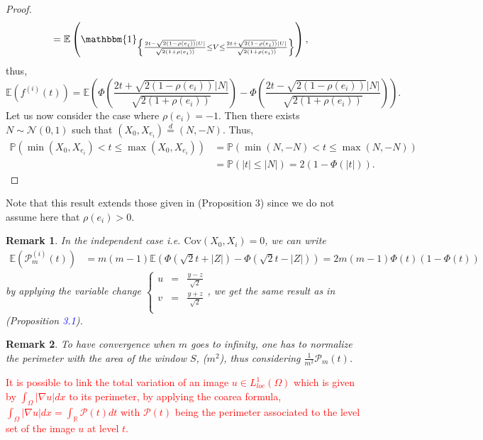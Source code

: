 \documentclass[12pt]{article}
\theoremstyle{Theorem}
\newtheorem{remark}{Remark}
\begin{document}
\begin{proof}
{\begin{align*}
& = \mathbb{E}\left(\mathbbm{1}_{\left\{\frac{2t - \sqrt{2(1-\rho(e_i))}|U|}{\sqrt{2(1+\rho(e_i))}}  \leq V \leq \frac{2t + \sqrt{2(1-\rho(e_i))}|U|}{\sqrt{2(1+\rho(e_i))}}\right\}}\right), 
\end{align*}}  
thus,
$$\mathbb{E}\left(f^{(i)}(t)\right) = \mathbb{E}\left(\Phi\left(\dfrac{2t + \sqrt{2(1-\rho(e_i))}|N|}{\sqrt{2(1+\rho(e_i))}}\right)  - \Phi\left(\dfrac{2t - \sqrt{2(1-\rho(e_i))}|N|}{\sqrt{2(1+\rho(e_i))}}\right)\right).$$
Let us now consider the case where $\rho(e_i) = -1$. Then there exists $N \sim \mathcal{N}\left(0,1\right)$ such that $\left(X_{\scriptscriptstyle 0}, X_{e_i}\right) \overset{d}{=} \left(N, -N\right)$. Thus, 
\begin{align*}
\mathbb{P}\left(\min\left(X_{\scriptscriptstyle 0}, X_{e_i}\right) < t \leq \max\left(X_{\scriptscriptstyle 0}, X_{e_i}\right)\right) & = \mathbb{P}\left(\min\left(N, -N\right) < t \leq \max\left(N, -N\right)\right) \\
& = \mathbb{P}\left(|t| \leq |N|\right) = 2\left(1 - \Phi\left(|t|\right)\right).
\end{align*}
\end{proof}
Note that this result extends those given in \cite{HermineAgnes} (Proposition 3) since we do not assume here that $\rho(e_i) > 0$. 
\begin{remark}
\label{iidCase}
In the independent case \textit{i.e.} $\text{Cov}\left(X_{0}, X_i\right) = 0$, we can write
{\small
\begin{align*}
\mathbb{E}\left(\mathcal{P}^{\scriptscriptstyle  (i)}_{m}(t) \right) & = m(m-1)\mathbb{E}\left(\Phi\left(\sqrt{2}t + |Z|\right) - \Phi\left(\sqrt{2}t - |Z|\right)\right) = 2m(m-1)\Phi(t)\left(1-\Phi(t)\right) 
\end{align*}}
by applying the variable change {\small$\left\{\begin{array}{rcl}
u & = & \frac{y - z}{\sqrt{2}} \\
v & = & \frac{y+z}{\sqrt{2}} \\
\end{array}\right.$}, we get the same result as in \cite{Psymetrie} (Proposition \textcolor{blue}{3.1}).
\end{remark}
\begin{remark}
To have convergence when $m$ goes to infinity, one has to normalize the perimeter with the area of the window $S$, ($m^2$), thus considering $\frac{1}{m^2}\mathcal{P}_{m}(t)$.
\end{remark}
\textcolor{red}{
It is possible to link the total variation of an image $u \in L^{1}_{loc}(\Omega)$ which is given by $\int_{\Omega}|\nabla u|dx$ to its perimeter, by applying the coarea formula, $\int_{\Omega}|\nabla u|dx = \int_{\mathbb{R}}\mathcal{P}(t)dt$ with $\mathcal{P}(t)$ being the perimeter associated to the level set of the image $u$ at level $t$.}
\end{document}
